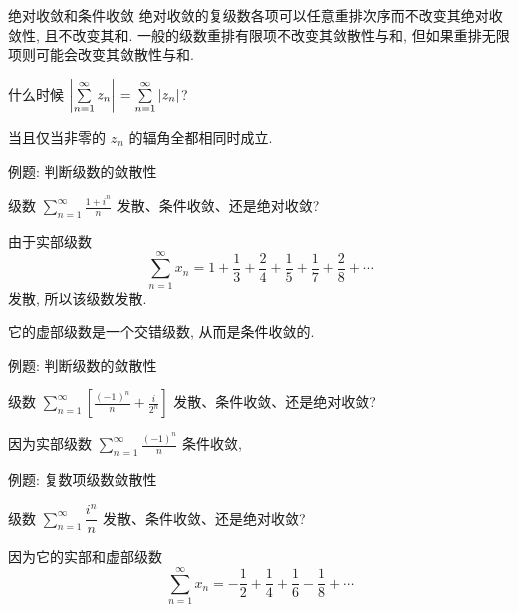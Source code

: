 \begin{frame}{绝对收敛和条件收敛}
\onslide<+->
绝对收敛的复级数各项可以任意重排次序而不改变其绝对收敛性, 且不改变其和.
\onslide<+->
一般的级数重排有限项不改变其敛散性与和, 但如果重排无限项则可能会改变其敛散性与和.
\onslide<+->
\begin{thinking}
什么时候 $\left|\sum\limits_{n=1}^\infty z_n\right|=\sum\limits_{n=1}^\infty|z_n|$?
\end{thinking}
\onslide<+->
\begin{answer}
当且仅当非零的 $z_n$ 的辐角全都相同时成立.
\end{answer}
\end{frame}


\begin{frame}{例题: 判断级数的敛散性}
\onslide<+->
\begin{example}
级数 $\displaystyle\sum_{n=1}^\infty\frac{1+i^n}n$ 发散、条件收敛、还是绝对收敛?
\end{example}
\onslide<+->
\begin{solution}
由于实部级数
\[\sum_{n=1}^\infty x_n=
1+\frac13+\frac24+\frac15+\frac17+\frac28+\cdots\]
发散, 所以该级数发散.
\end{solution}
\onslide<+->
它的虚部级数是一个交错级数, 从而是条件收敛的.
\end{frame}


\begin{frame}{例题: 判断级数的敛散性}
\onslide<+->
\begin{example}
级数 $\displaystyle\sum_{n=1}^\infty\left[\frac{(-1)^n}n+\frac i{2^n}\right]$ 发散、条件收敛、还是绝对收敛?
\end{example}
\onslide<+->
\begin{solution}
因为实部级数 $\displaystyle\sum_{n=1}^\infty\frac{(-1)^n}n$ 条件收敛,
\end{solution}
\end{frame}



\begin{frame}{例题: 复数项级数敛散性}
\onslide<+->
\begin{example}
级数 $\displaystyle\sum_{n=1}^\infty\dfrac{i^n}n$ 发散、条件收敛、还是绝对收敛?
\end{example}
\onslide<+->
\begin{solution}
因为它的实部和虚部级数
\[\sum_{n=1}^\infty x_n=-\frac12+\frac14+\frac16-\frac18+\cdots\]
\end{solution}
\end{frame}


